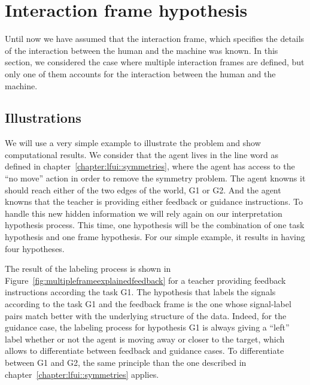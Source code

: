 
\section{Interaction frame hypothesis}
\label{chapter:limitations:framehypothesis}


Until now we have assumed that the interaction frame, which specifies the details of the interaction between the human and the machine was known. In this section, we considered the case where multiple interaction frames are defined, but only one of them accounts for the interaction between the human and the machine.


\subsection{Illustrations}

We will use a very simple example to illustrate the problem and show computational results. We consider that the agent lives in the line word as defined in chapter~\ref{chapter:lfui::symmetries}, where the agent has access to the ``no move'' action in order to remove the symmetry problem. The agent knowns it should reach either of the two edges of the world, G1 or G2. And the agent knowns that the teacher is providing either feedback or guidance instructions. To handle this new hidden information we will rely again on our interpretation hypothesis process. This time, one hypothesis will be the combination of one task hypothesis and one frame hypothesis. For our simple example, it results in having four hypotheses.

The result of the labeling process is shown in Figure~\ref{fig:multipleframeexplainedfeedback} for a teacher providing feedback instructions according the task G1. The hypothesis that labels the signals according to the task G1 and the feedback frame is the one whose signal-label pairs match better with the underlying structure of the data. Indeed, for the guidance case, the labeling process for hypothesis G1 is always giving a ``left'' label whether or not the agent is moving away or closer to the target, which allows to differentiate between feedback and guidance cases. To differentiate between G1 and G2, the same principle than the one described in chapter~\ref{chapter:lfui::symmetries} applies.

